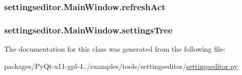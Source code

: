 \subsubsection[{refresh\+Act}]{\setlength{\rightskip}{0pt plus 5cm}settingseditor.\+Main\+Window.\+refresh\+Act}\label{classsettingseditor_1_1MainWindow_aeb48539123f030b37e40382e873b4c0c}
\hypertarget{classsettingseditor_1_1MainWindow_a0409e84fd53fc6386f32368b6a84415f}{}
\subsubsection[{settings\+Tree}]{\setlength{\rightskip}{0pt plus 5cm}settingseditor.\+Main\+Window.\+settings\+Tree}\label{classsettingseditor_1_1MainWindow_a0409e84fd53fc6386f32368b6a84415f}


The documentation for this class was generated from the following file\+:\begin{DoxyCompactItemize}
\item 
packages/\+Py\+Qt-\/x11-\/gpl-\/4../examples/tools/settingseditor/\hyperlink{settingseditor_8py}{settingseditor.\+py}\end{DoxyCompactItemize}

